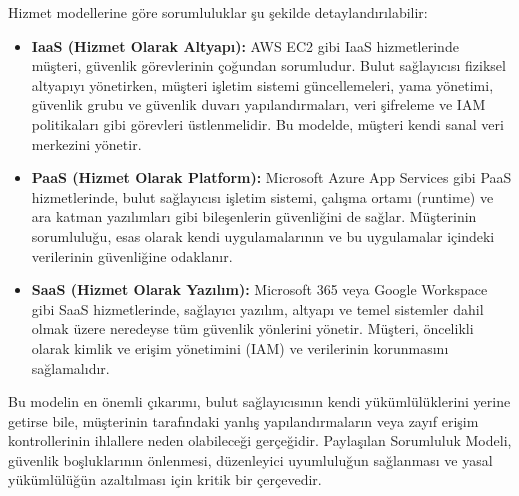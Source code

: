 Hizmet modellerine göre sorumluluklar şu şekilde detaylandırılabilir:

\begin{itemize}
    \item \textbf{IaaS (Hizmet Olarak Altyapı):} AWS EC2 gibi IaaS hizmetlerinde müşteri, güvenlik görevlerinin çoğundan sorumludur. Bulut sağlayıcısı fiziksel altyapıyı yönetirken, müşteri işletim sistemi güncellemeleri, yama yönetimi, güvenlik grubu ve güvenlik duvarı yapılandırmaları, veri şifreleme ve IAM politikaları gibi görevleri üstlenmelidir. Bu modelde, müşteri kendi sanal veri merkezini yönetir.
    \item \textbf{PaaS (Hizmet Olarak Platform):} Microsoft Azure App Services gibi PaaS hizmetlerinde, bulut sağlayıcısı işletim sistemi, çalışma ortamı (runtime) ve ara katman yazılımları gibi bileşenlerin güvenliğini de sağlar. Müşterinin sorumluluğu, esas olarak kendi uygulamalarının ve bu uygulamalar içindeki verilerinin güvenliğine odaklanır.
    \item \textbf{SaaS (Hizmet Olarak Yazılım):} Microsoft 365 veya Google Workspace gibi SaaS hizmetlerinde, sağlayıcı yazılım, altyapı ve temel sistemler dahil olmak üzere neredeyse tüm güvenlik yönlerini yönetir. Müşteri, öncelikli olarak kimlik ve erişim yönetimini (IAM) ve verilerinin korunmasını sağlamalıdır.
\end{itemize}

Bu modelin en önemli çıkarımı, bulut sağlayıcısının kendi yükümlülüklerini yerine getirse bile, müşterinin tarafındaki yanlış yapılandırmaların veya zayıf erişim kontrollerinin ihlallere neden olabileceği gerçeğidir. Paylaşılan Sorumluluk Modeli, güvenlik boşluklarının önlenmesi, düzenleyici uyumluluğun sağlanması ve yasal yükümlülüğün azaltılması için kritik bir çerçevedir.


